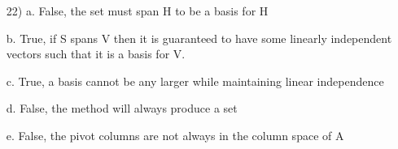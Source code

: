 \documentclass{article}
\begin{document}
\begin{enumerate}
    \item[22)]
      a. False, the set must span H to be a basis for H

      b. True, if S spans V then it is guaranteed to have some
      linearly independent vectors such that it is a basis for
      V.
  
      c. True, a basis cannot be any larger while maintaining
      linear independence

      d. False, the method will always produce a set

      e. False, the pivot columns are not always in the 
      column space of A

      \end{enumerate}
\end{document}
